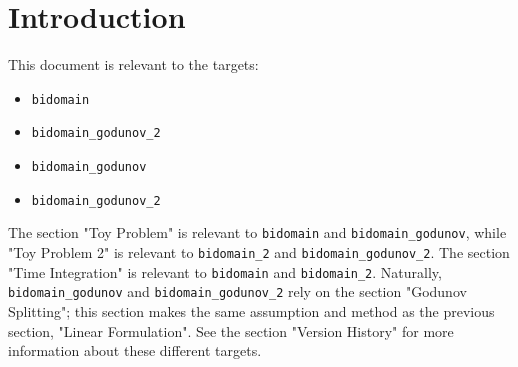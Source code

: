 \documentclass{article}
\begin{document}
\section{Introduction}

This document is relevant to the targets:
\begin{itemize}
    \item \texttt{bidomain}
    \item \texttt{bidomain\_godunov\_2}
    \item \texttt{bidomain\_godunov}
    \item \texttt{bidomain\_godunov\_2}
\end{itemize}
\noindent The section "Toy Problem" is relevant to
\texttt{bidomain} and \texttt{bidomain\_godunov},
while "Toy Problem 2" is relevant to
\texttt{bidomain\_2} and \texttt{bidomain\_godunov\_2}.
The section "Time Integration" is relevant to
\texttt{bidomain} and \texttt{bidomain\_2}.
Naturally, \texttt{bidomain\_godunov} and \texttt{bidomain\_godunov\_2}
rely on the section "Godunov Splitting";
this section makes the same assumption and method
as the previous section, "Linear Formulation".
See the section "Version History" for more information
about these different targets.
\end{document}
